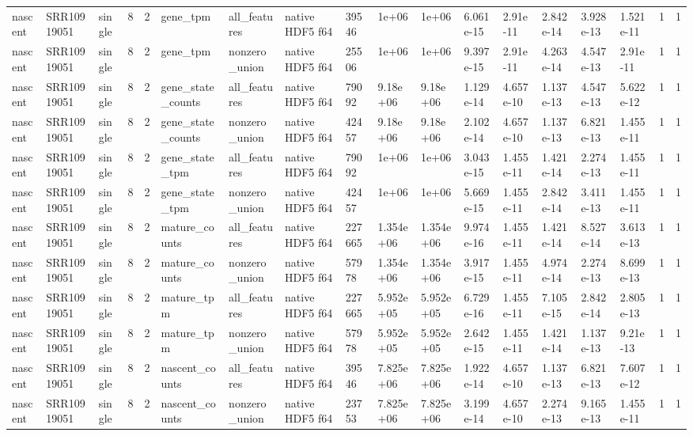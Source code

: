 \begin{tabular}{llllllllllllllllll}
nascent & SRR10919051 & single & 8 & 2 & gene\_tpm & all\_features & native HDF5 f64 & 39546 & 1e+06 & 1e+06 & 6.061e-15 & 2.91e-11 & 2.842e-14 & 3.928e-13 & 1.521e-11 & 1 & 1 \\
nascent & SRR10919051 & single & 8 & 2 & gene\_tpm & nonzero\_union & native HDF5 f64 & 25506 & 1e+06 & 1e+06 & 9.397e-15 & 2.91e-11 & 4.263e-14 & 4.547e-13 & 2.91e-11 & 1 & 1 \\
nascent & SRR10919051 & single & 8 & 2 & gene\_state\_counts & all\_features & native HDF5 f64 & 79092 & 9.18e+06 & 9.18e+06 & 1.129e-14 & 4.657e-10 & 1.137e-13 & 4.547e-13 & 5.622e-12 & 1 & 1 \\
nascent & SRR10919051 & single & 8 & 2 & gene\_state\_counts & nonzero\_union & native HDF5 f64 & 42457 & 9.18e+06 & 9.18e+06 & 2.102e-14 & 4.657e-10 & 1.137e-13 & 6.821e-13 & 1.455e-11 & 1 & 1 \\
nascent & SRR10919051 & single & 8 & 2 & gene\_state\_tpm & all\_features & native HDF5 f64 & 79092 & 1e+06 & 1e+06 & 3.043e-15 & 1.455e-11 & 1.421e-14 & 2.274e-13 & 1.455e-11 & 1 & 1 \\
nascent & SRR10919051 & single & 8 & 2 & gene\_state\_tpm & nonzero\_union & native HDF5 f64 & 42457 & 1e+06 & 1e+06 & 5.669e-15 & 1.455e-11 & 2.842e-14 & 3.411e-13 & 1.455e-11 & 1 & 1 \\
nascent & SRR10919051 & single & 8 & 2 & mature\_counts & all\_features & native HDF5 f64 & 227665 & 1.354e+06 & 1.354e+06 & 9.974e-16 & 1.455e-11 & 1.421e-14 & 8.527e-14 & 3.613e-13 & 1 & 1 \\
nascent & SRR10919051 & single & 8 & 2 & mature\_counts & nonzero\_union & native HDF5 f64 & 57978 & 1.354e+06 & 1.354e+06 & 3.917e-15 & 1.455e-11 & 4.974e-14 & 2.274e-13 & 8.699e-13 & 1 & 1 \\
nascent & SRR10919051 & single & 8 & 2 & mature\_tpm & all\_features & native HDF5 f64 & 227665 & 5.952e+05 & 5.952e+05 & 6.729e-16 & 1.455e-11 & 7.105e-15 & 2.842e-14 & 2.805e-13 & 1 & 1 \\
nascent & SRR10919051 & single & 8 & 2 & mature\_tpm & nonzero\_union & native HDF5 f64 & 57978 & 5.952e+05 & 5.952e+05 & 2.642e-15 & 1.455e-11 & 1.421e-14 & 1.137e-13 & 9.21e-13 & 1 & 1 \\
nascent & SRR10919051 & single & 8 & 2 & nascent\_counts & all\_features & native HDF5 f64 & 39546 & 7.825e+06 & 7.825e+06 & 1.922e-14 & 4.657e-10 & 1.137e-13 & 6.821e-13 & 7.607e-12 & 1 & 1 \\
nascent & SRR10919051 & single & 8 & 2 & nascent\_counts & nonzero\_union & native HDF5 f64 & 23753 & 7.825e+06 & 7.825e+06 & 3.199e-14 & 4.657e-10 & 2.274e-13 & 9.165e-13 & 1.455e-11 & 1 & 1 \\

\end{tabular}
